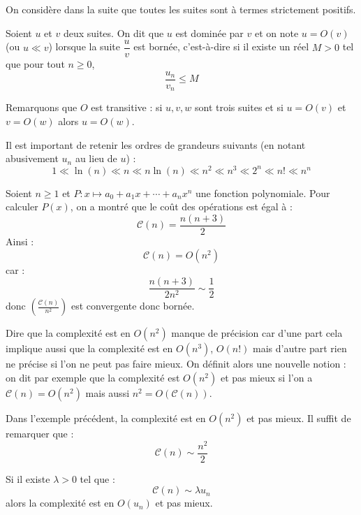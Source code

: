 \documentclass[french,11pt,twoside]{VcCours}
\begin{document}
\medskip

On considère dans la suite que toutes les suites sont à termes strictement positifs.

\begin{Definition}{} Soient $u$ et $v$ deux suites. 
    On dit que $u$ est dominée par $v$ et on note $u=O(v)$ (ou $u\ll v$) 
    lorsque la suite $\dfrac{u}{v}$ est bornée, c'est-à-dire si il existe 
    un réel $M>0$ tel que pour tout $n \geq 0$,
    $$ \frac{u_n}{v_n} \leq M$$
\end{Definition} 

Remarquons que $O$ est transitive : si $u,v,w$ sont trois suites 
et si $u=O(v)$ et $v=O(w)$ alors $u=O(w)$.

\medskip

Il est important de retenir les ordres de grandeurs suivants (en notant abusivement $u_n$ au lieu de $u$) : 
$$ 1\ll \ln(n) \ll n \ll n \ln(n) \ll n^2 \ll n^3 \ll 2^n \ll n! \ll n^n$$

\begin{Exercice}{} Soient $n \geq 1$ et $P : x \mapsto a_0 + a_1 x + \cdots + a_n x^n$ une fonction polynomiale. Pour calculer $P(x)$, on a montré que le coût des opérations est égal à :
$$ \mathcal{C}(n) = \frac{n(n+3)}{2}$$
Ainsi :
$$ \mathcal{C}(n) = O(n^2)$$
car :
$$ \frac{n(n+3)}{2n^2} \sim \frac{1}{2}$$
donc $\left(\frac{\mathcal{C}(n)}{n^2} \right)$ est convergente donc bornée.
\end{Exercice}

\begin{Remarque}{} Dire que la complexité est en $O(n^2)$ manque de précision car d'une part cela implique aussi que la complexité est en $O(n^3)$, $O(n!)$ mais d'autre part rien ne précise si l'on ne peut pas faire mieux. On définit alors une nouvelle notion : on dit par exemple que la complexité est $O(n^2)$ \og et pas mieux \fg si l'on a $\mathcal{C}(n)=O(n^2)$ mais aussi $n^2 = O(\mathcal{C}(n))$.
\end{Remarque}

\begin{Exercice}{} Dans l'exemple précédent, la complexité est en $O(n^2)$ et pas mieux. Il suffit de remarquer que :
$$ \mathcal{C}(n) \sim \frac{n^2}{2}$$
\end{Exercice}

\begin{Remarque}{} Si il existe $\lambda >0$ tel que :
$$ \mathcal{C}(n) \sim \lambda u_n$$
alors la complexité est en $O(u_n)$ et pas mieux.
\end{Remarque}
\end{document}
